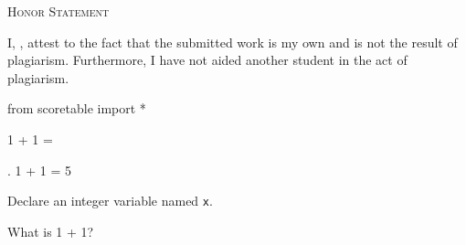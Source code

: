 

\renewcommand\AUTHOR{jdoe5@cougars.ccis.edu} %


\topmattertwo



\begin{center}
  \textsc{Honor Statement}
\end{center}
I, ,
attest to the fact that the submitted work is my own and
is not the result of plagiarism.
Furthermore, I have not aided another student in the act of
plagiarism.

\begin{python}
from scoretable import *
\end{python}

\newpage


\nextq

1 + 1 = \answerbox{}

\nextq
\tf. 1 + 1 = 5
\dotfill {}

\newpage
\nextq
Declare an integer variable named \verb!x!.
\ANSWER
\begin{answercode}  
\end{answercode}

\newpage
\nextq
What is 1 + 1?
\ANSWER
\begin{answerlong}

\end{answerlong}

\newpage

